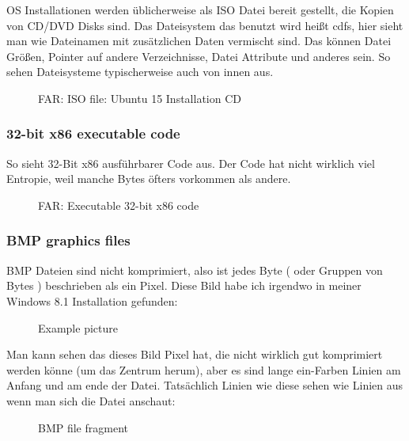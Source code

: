 \ac{OS} Installationen werden üblicherweise als ISO Datei bereit gestellt, die Kopien von CD/DVD Disks sind. 
Das Dateisystem das benutzt wird heißt \ac{cdfs}, hier sieht man wie Dateinamen mit zusätzlichen Daten vermischt sind.
Das können Datei Größen, Pointer auf andere Verzeichnisse, Datei Attribute und anderes sein. 
So sehen Dateisysteme typischerweise auch von innen aus.

\begin{figure}[H]
\centering
{}
\caption{FAR: ISO file: Ubuntu 15 Installation \ac{CD}}
\end{figure}

\clearpage
\subsubsection{32-bit x86 executable code} %

So sieht 32-Bit x86 ausführbarer Code aus. 
Der Code hat nicht wirklich viel Entropie, weil manche Bytes öfters vorkommen als andere.

\begin{figure}[H]
\centering
{}
\caption{FAR: Executable 32-bit x86 code}
\end{figure}


\clearpage
\subsubsection{BMP graphics files}


BMP Dateien sind nicht komprimiert, also ist jedes Byte ( oder Gruppen von Bytes ) beschrieben als
ein Pixel. Diese Bild habe ich irgendwo in meiner Windows 8.1 Installation gefunden: 

\begin{figure}[H]
\centering
{}
\caption{Example picture}
\end{figure}

Man kann sehen das dieses Bild Pixel hat, die nicht wirklich gut komprimiert werden könne (um das Zentrum herum),
aber es sind lange ein-Farben Linien am Anfang und am ende der Datei. Tatsächlich Linien wie diese sehen wie Linien aus
wenn man sich die Datei anschaut:

\begin{figure}[H]
\centering
{}
\caption{BMP file fragment}
\end{figure}


